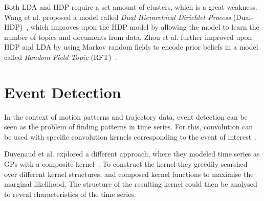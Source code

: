 Both LDA and HDP require a set amount of clusters, which is a great
weakness. Wang et al. proposed a model called \textit{Dual Hierarchical Dirichlet
Process} (Dual-HDP)~\cite{Wang2008Jun}, which improves upon the HDP model
by allowing the model to learn the number of topics and documents from
data. Zhou et al. further improved upon HDP and LDA by using Markov random
fields to encode prior beliefs in a model called \textit{Random Field
  Topic} (RFT)~\cite{Zhou2011Jun}.

\section{Event Detection}
In the context of motion patterns and trajectory data, event detection
can be seen as the problem of finding patterns in time
series. For this, convolution can be used with specific convolution
kernels corresponding to the event of interest~\cite{smith1997scientist}.

Duvenaud et al. explored a different approach, where they modeled
time series as GPs with a composite kernel~\cite{duvenaud2013structure}. To construct the
kernel they greedily searched over different kernel structures,
and composed kernel functions to maximise the marginal likelihood.
The structure of the resulting kernel could then be analysed to reveal
characteristics of the time series.

